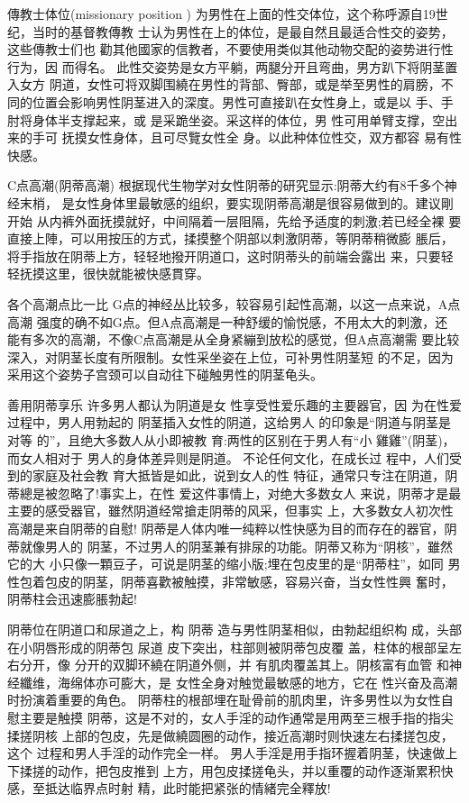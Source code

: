 \documentclass[12pt,UTF8]{ctexbook}
\begin{document}
傳教士体位(missionary position )
为男性在上面的性交体位，这个称呼源自19世纪，当时的基督教傳教
士认为男性在上的体位，是最自然且最适合性交的姿势，这些傳教士们也
勸其他國家的信教者，不要使用类似其他动物交配的姿势进行性行为，因
而得名。
此性交姿势是女方平躺，两腿分开且弯曲，男方趴下将阴茎置入女方
阴道，女性可将双脚围繞在男性的背部、臀部，或是举至男性的肩膀，不
同的位置会影响男性阴茎进入的深度。男性可直接趴在女性身上，或是以
手、手肘将身体半支撑起来，或
是采跪坐姿。采这样的体位，男
性可用单臂支撑，空出来的手可
抚摸女性身体，且可尽覽女性全
身。以此种体位性交，双方都容
易有性快感。

C点高潮(阴蒂高潮)
根据现代生物学对女性阴蒂的研究显示:阴蒂大约有8千多个神经末梢，
是女性身体里最敏感的组织，要实现阴蒂高潮是很容易做到的。建议剛开始
从内裤外面抚摸就好，中间隔着一层阻隔，先给予适度的刺激;若已经全裸
要直接上陣，可以用按压的方式，揉摸整个阴部以刺激阴蒂，等阴蒂稍微膨
脹后，将手指放在阴蒂上方，轻轻地撥开阴道口，这时阴蒂头的前端会露出
来，只要轻轻抚摸这里，很快就能被快感貫穿。

各个高潮点比一比
G点的神经丛比较多，较容易引起性高潮，以这一点来说，A点高潮
强度的确不如G点。但A点高潮是一种舒缓的愉悦感，不用太大的刺激，还
能有多次的高潮，不像C点高潮是从全身紧繃到放松的感觉，但A点高潮需
要比较深入，对阴茎长度有所限制。女性采坐姿在上位，可补男性阴茎短
的不足，因为采用这个姿势子宫颈可以自动往下碰触男性的阴茎龟头。

善用阴蒂享乐
许多男人都认为阴道是女
性享受性爱乐趣的主要器官，因
为在性爱过程中，男人用勃起的
阴茎插入女性的阴道，这给男人
的印象是“阴道与阴茎是对等
的”，且绝大多数人从小即被教
育:两性的区别在于男人有“小
雞雞”(阴茎)，而女人相对于
男人的身体差异则是阴道。
不论任何文化，在成长过
程中，人们受到的家庭及社会教
育大抵皆是如此，说到女人的性
特征，通常只专注在阴道，阴蒂總是被忽略了!事实上，在性
爱这件事情上，对绝大多数女人
来说，阴蒂才是最主要的感受器官，雖然阴道经常搶走阴蒂的风采，但事实
上，大多数女人初次性高潮是来自阴蒂的自慰!
阴蒂是人体内唯一纯粹以性快感为目的而存在的器官，阴蒂就像男人的
阴茎，不过男人的阴茎兼有排尿的功能。阴蒂又称为“阴核”，雖然它的大
小只像一顆豆子，可说是阴茎的缩小版;埋在包皮里的是“阴蒂柱”，如同
男性包着包皮的阴茎，阴蒂喜歡被触摸，非常敏感，容易兴奋，当女性性興
奮时，阴蒂柱会迅速膨脹勃起!

阴蒂位在阴道口和尿道之上，构
阴蒂
造与男性阴茎相似，由勃起组织构
成，头部在小阴唇形成的阴蒂包
尿道
皮下突出，柱部则被阴蒂包皮覆
盖，柱体的根部呈左右分开，像
分开的双脚环繞在阴道外侧，并
有肌肉覆盖其上。阴核富有血管
和神经纖维，海绵体亦可膨大，是
女性全身对触觉最敏感的地方，它在
性兴奋及高潮时扮演着重要的角色。
阴蒂柱的根部埋在耻骨前的肌肉里，许多男性以为女性自慰主要是触摸
阴蒂，这是不对的，女人手淫的动作通常是用两至三根手指的指尖揉搓阴核
上部的包皮，先是做繞圆圈的动作，接近高潮时则快速左右揉搓包皮，这个
过程和男人手淫的动作完全一样。
男人手淫是用手指环握着阴茎，快速做上下揉搓的动作，把包皮推到
上方，用包皮揉搓龟头，并以重覆的动作逐渐累积快感，至抵达临界点时射
精，此时能把紧张的情緒完全釋放!
\end{document}
